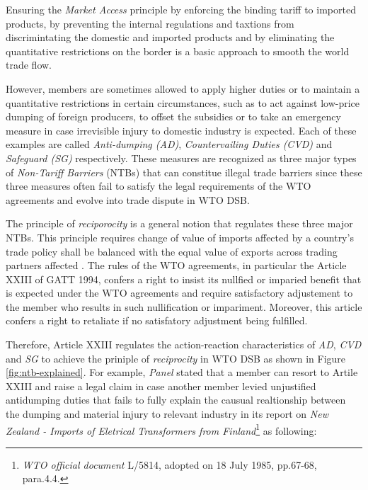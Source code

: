 Ensuring the \textit{Market Access} principle 
by enforcing
the binding tariff to imported products, by preventing the internal regulations 
and taxtions from discrimintating the domestic and imported products
and by eliminating the quantitative restrictions on the border 
is a basic approach to smooth the world trade flow. 

However, members are sometimes allowed to apply higher duties or to maintain a quantitative restrictions in certain circumstances, such as 
to act against low-price dumping of foreign producers, to offset the subsidies
or to take an emergency measure in case irrevisible injury to domestic industry is expected. Each of these examples 
are called \textit{Anti-dumping (AD)}, \textit{Countervailing Duties (CVD)} and \textit{Safeguard (SG)} respectively. These measures are recognized as 
three major types of \textit{Non-Tariff Barriers} (NTBs) that can constitue illegal trade barriers
since these three measures often fail to satisfy the legal requirements of the WTO agreements and evolve into trade dispute in WTO DSB.

The principle of \textit{reciporocity} is a general notion that regulates these three major NTBs.
This principle requires change of value of imports affected by a country's trade policy 
shall be balanced with the equal value of exports across trading partners affected \citep{bagwell1999}.
The rules of the WTO agreements, in particular the Article XXIII of GATT 1994, 
confers a right to insist its nullfied or imparied benefit that is expected under the WTO agreements and require satisfactory adjustement to the member 
who results in such nullification or impariment. Moreover, this article confers a right to retaliate if no satisfatory adjustment being fulfilled.

Therefore, Article XXIII regulates the action-reaction characteristics of \textit{AD}, \textit{CVD} and \textit{SG} to achieve the priniple of \textit{reciprocity} in WTO DSB as shown in Figure \ref{fig:ntb-explained}.
For example, \textit{Panel} stated that a member can resort to Artile XXIII and raise a legal claim in case another member levied unjustified antidumping duties that fails to fully explain the causual realtionship between the dumping and material injury to relevant industry in its report on \textit{New Zealand - Imports of Eletrical Transformers from Finland}\footnote{\textit{WTO official document} L/5814, adopted on 18 July 1985, pp.67-68, para.4.4.} as following:

